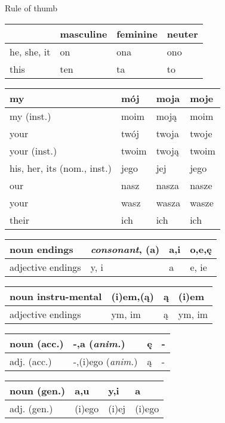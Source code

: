 \documentclass[10pt,twoside]{../filofax2}
\begin{document}
\centering

\begin{ffpage}{\huge Rule of thumb}
	\begin{tabular}{|m{1.3cm}|m{1.75cm}|m{1.75cm}|m{1.75cm}|}
		\hline
		&masculine&feminine&neuter\\\hline
		he, she, it&on&ona&ono\\\hline
		this&ten&ta&to\\\hline
\end{tabular}
\begin{tabular}{|m{1.3cm}|m{1.75cm}|m{1.75cm}|m{1.75cm}|}
\hline
		my&m\'{o}j&moja&moje\\\hline
		my (inst.)&moim&moj\k{a}&moim\\\hline
		your&tw\'oj&twoja&twoje\\\hline
		your (inst.)&twoim&twoj\k{a}&twoim\\\hline
		his, her, its (nom., inst.)&jego& jej& jego\\\hline
		our&nasz&nasza&nasze\\\hline
		your&wasz&wasza&wasze\\\hline
		their&ich&ich&ich\\\hline
		\end{tabular}
		\begin{tabular}{|m{1.3cm}|m{1.75cm}|m{1.75cm}|m{1.75cm}|}
		\hline
		noun endings&{\sl consonant}, (a)&a,i&o,e,\k{e}\\\hline
		{\footnotesize adjective} endings&y, i&a&e, ie\\\hline
	\end{tabular}
	\begin{tabular}{|m{1.3cm}|m{1.75cm}|m{1.75cm}|m{1.75cm}|}
		\hline
		noun {\small instru-\newline mental}& (i)em,(\k{a})&\k{a}&(i)em\\\hline
		{\footnotesize adjective} endings& ym, im&\k{a}&ym, im\\\hline
	\end{tabular}
	\begin{tabular}{|m{1.3cm}|m{1.75cm}|m{1.75cm}|m{1.75cm}|}
		\hline
		noun (acc.) & -,\newline a ({\sl anim.}) & \k{e}&-\\\hline
		adj. (acc.) & -,\newline (i)ego ({\sl anim.}) & \k{a}&-\\\hline		
	\end{tabular}
	\begin{tabular}{|m{1.3cm}|m{1.75cm}|m{1.75cm}|m{1.75cm}|}
		\hline
		noun (gen.)&a,u&y,i&a\\\hline
		adj. (gen.)&(i)ego&(i)ej&(i)ego\\\hline
	\end{tabular}
	
	
\end{ffpage}
\end{document}
